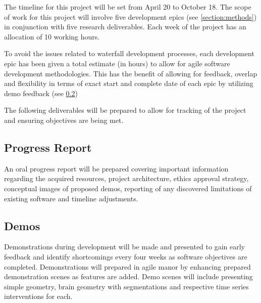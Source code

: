 



The timeline for this project will be set from April 20 to October 18. The scope of work for this project will involve five development epics (see \cref{section:methods}) in conjunction with five research deliverables. Each week of the project has an allocation of 10 working hours.

To avoid the issues related to waterfall development processes, each development epic has been given a total estimate (in hours) to allow for agile software development methodologies. This has the benefit of allowing for feedback, overlap and flexibility in terms of exact start and complete date of each epic by utilizing demo feedback (see \cref{section:demos})

The following deliverables will be prepared to allow for tracking of the project and ensuring objectives are being met.

\subsection{Progress Report}

An oral progress report will be prepared covering important information regarding the acquired resources, project architecture, ethics approval strategy, conceptual images of proposed demos, reporting of any discovered limitations of existing software and timeline adjustments.

\subsection{Demos}
\label{section:demos}

Demonstrations during development will be made and presented to gain early feedback and identify shortcomings every four weeks as software objectives are completed. Demonstrations will prepared in agile manor by enhancing prepared demonstration scenes as features are added. Demo scenes will include presenting simple geometry, brain geometry with segmentations and respective time series interventions for each.

